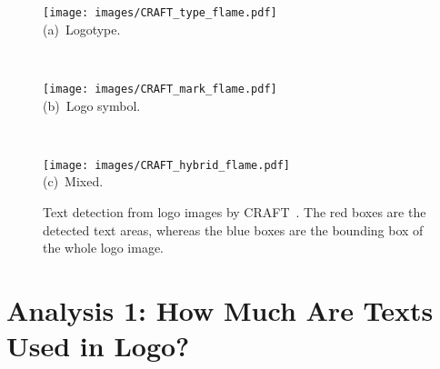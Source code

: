 \documentclass[runningheads]{llncs}
\begin{document}
\begin{figure}[t]
 \begin{minipage}{0.30\textwidth}
  \centering
   \texttt{[image: images/CRAFT\_type\_flame.pdf]}\\
      (a)~Logotype.
 \end{minipage}
 \ 
 \begin{minipage}{0.30\textwidth}
  \centering
  \texttt{[image: images/CRAFT\_mark\_flame.pdf]}\\
   (b)~Logo symbol.
 \end{minipage}
 \ 
 \begin{minipage}{0.30\textwidth}
  \centering
  \texttt{[image: images/CRAFT\_hybrid\_flame.pdf]}\\
   (c)~Mixed.
 \end{minipage}
    \caption{Text detection from logo images by CRAFT~\cite{baek2019character}. The red boxes are the detected text areas, whereas the blue boxes are the bounding box of the whole logo image.}
    \label{fig:CRAFT}
\end{figure}
\section{Analysis 1: How Much Are Texts Used in Logo?}
\end{document}
